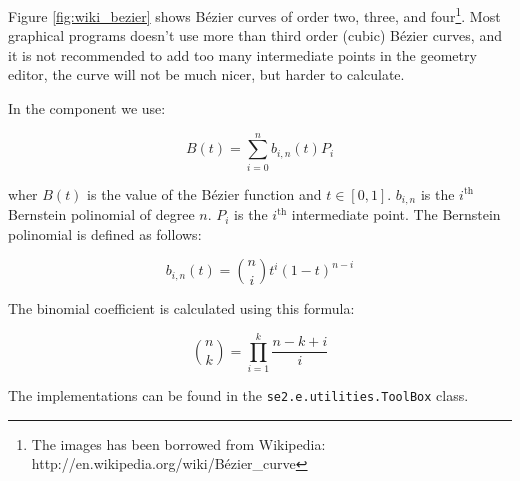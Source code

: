 Figure \ref{fig:wiki_bezier} shows Bézier curves of order two, three,
and four\footnote{The images has been borrowed from Wikipedia: http://en.wikipedia.org/wiki/Bézier\_curve}.
Most graphical programs doesn't use
more than third order (cubic) Bézier curves, and it is not recommended to add too many intermediate points
in the geometry editor, the curve will not be much nicer, but harder to calculate. 

In the component we use:

\begin{equation}
	B(t) = \sum_{i = 0}^n b_{i,n}(t)P_i
\end{equation}

wher $B(t)$ is the value of the Bézier function and $t \in [0,1]$. $b_{i,n}$ is the $i^{\text{th}}$ Bernstein polinomial of
degree $n$. $P_i$ is the $i^{\text{th}}$ intermediate point. The Bernstein polinomial is defined as follows:

\begin{equation}
	b_{i,n}(t) = \binom{n}{i}t^i(1-t)^{n-i}
\end{equation}

The binomial coefficient is calculated using this formula:

\begin{equation}
	\binom{n}{k} = \prod_{i = 1}^k \frac{n - k + i}{i}
\end{equation}

The implementations can be found in the \texttt{se2.e.utilities.ToolBox} class.
